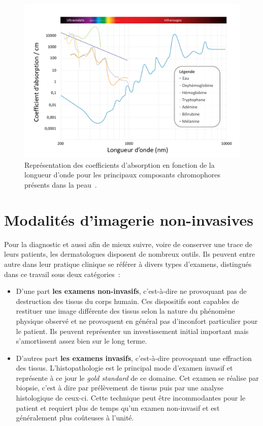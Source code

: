 \begin{figure}[H]
    \centering
    \includegraphics[width=\linewidth]{contents/chapter_2/resources/scheme_light_absorption.pdf}
    \caption{Représentation des coefficients d'absorption en fonction de la longueur d'onde pour les principaux composants chromophores présents dans la peau~\cite{Raulin2013}.}
    \label{fig:scheme_light_absorption}
\end{figure}
 
\clearpage

\section{Modalités d’imagerie non-invasives}
Pour la diagnostic et aussi afin de mieux suivre, voire de conserver une trace de leurs patients, les dermatologues disposent de nombreux outils. Ils peuvent entre autre dans leur pratique clinique se référer à divers types d’examens, distingués dans ce travail sous deux catégories~:
\begin{itemize}
    \item D’une part \textbf{les examens non-invasifs}, c’est-à-dire ne provoquant pas de destruction des tissus du corps humain. Ces dispositifs sont capables de restituer une image différente des tissus selon la nature du phénomène physique observé et ne provoquent en général pas d’inconfort particulier pour le patient. Ils peuvent représenter un investissement initial important mais s'amortissent assez bien sur le long terme. 
    \item D’autres part \textbf{les examens invasifs}, c’est-à-dire provoquant une effraction des tissus. L'histopathologie est le principal mode d'examen invasif et représente à ce jour le \textit{gold standard} de ce domaine. Cet examen se réalise par biopsie, c'est à dire par prélèvement de tissus puis par une analyse histologique de ceux-ci. Cette technique peut être incommodantes pour le patient et requiert plus de temps qu'un examen non-invasif et est généralement plus coûteuses à l'unité.
\end{itemize}\par

